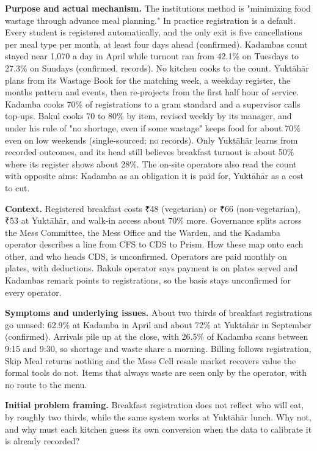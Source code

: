 \documentclass[
  10pt,
  table]{article}
\begin{document}
\textbf{Purpose and actual mechanism.} The institution\textquotesingle s method is "minimizing food wastage through advance meal planning." In practice registration is a default. Every student is registered automatically, and the only exit is five cancellations per meal type per month, at least four days ahead (confirmed). Kadamba\textquotesingle s count stayed near 1,070 a day in April while turnout ran from 42.1\% on Tuesdays to 27.3\% on Sundays (confirmed, records). No kitchen cooks to the count. Yuktāhār plans from its Wastage Book for the matching week, a weekday register, the month\textquotesingle s pattern and events, then re-projects from the first half hour of service. Kadamba cooks 70\% of registrations to a gram standard and a supervisor calls top-ups. Bakul cooks 70 to 80\% by item, revised weekly by its manager, and under his rule of "no shortage, even if some wastage" keeps food for about 70\% even on low weekends (single-sourced; no records). Only Yuktāhār learns from recorded outcomes, and its head still believes breakfast turnout is about 50\% where its register shows about 28\%. The on-site operators also read the count with opposite aims: Kadamba as an obligation it is paid for, Yuktāhār as a cost to cut.

\textbf{Context.} Registered breakfast costs ₹48 (vegetarian) or ₹66 (non-vegetarian), ₹53 at Yuktāhār, and walk-in access about 70\% more. Governance splits across the Mess Committee, the Mess Office and the Warden, and the Kadamba operator describes a line from CFS to CDS to Prism. How these map onto each other, and who heads CDS, is unconfirmed. Operators are paid monthly on plates, with deductions. Bakul\textquotesingle s operator says payment is on plates served and Kadamba\textquotesingle s remark points to registrations, so the basis stays unconfirmed for every operator.

\textbf{Symptoms and underlying issues.} About two thirds of breakfast registrations go unused: 62.9\% at Kadamba in April and about 72\% at Yuktāhār in September (confirmed). Arrivals pile up at the close, with 26.5\% of Kadamba scans between 9:15 and 9:30, so shortage and waste share a morning. Billing follows registration, Skip Meal returns nothing and the Mess Cell resale market recovers value the formal tools do not. Items that always waste are seen only by the operator, with no route to the menu.

\textbf{Initial problem framing.} Breakfast registration does not reflect who will eat, by roughly two thirds, while the same system works at Yuktāhār lunch. Why not, and why must each kitchen guess its own conversion when the data to calibrate it is already recorded?
\end{document}
